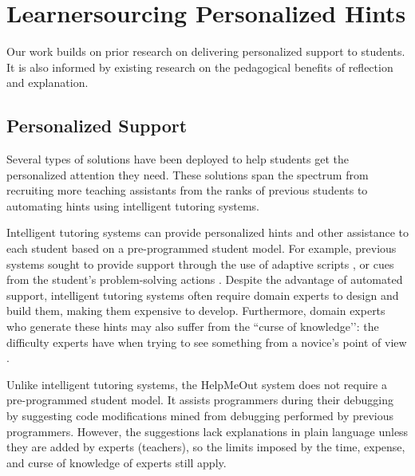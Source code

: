 \section{Learnersourcing Personalized Hints}

Our work builds on prior research on delivering personalized support to students. It is also informed by existing research on the pedagogical benefits of reflection and explanation.

\subsection{Personalized Support}

Several types of solutions have been deployed to help students get the personalized attention they need. These solutions span the spectrum from recruiting more teaching assistants from the ranks of previous students \cite{communityTAs} to automating hints using intelligent tutoring systems. 

Intelligent tutoring systems can provide personalized hints and other assistance to each student based on a pre-programmed student model. For example, previous systems sought to provide support through the use of adaptive scripts \cite{kumar2007tutorial}, or cues from the student’s problem-solving actions \cite{diziol}. Despite the advantage of automated support, intelligent tutoring systems often require domain experts to design and build them, making them expensive to develop.  Furthermore, domain experts who generate these hints may also suffer from the ``curse of knowledge’’: the difficulty experts have when trying to see something from a novice’s point of view \cite{curse}. 

Unlike intelligent tutoring systems, the HelpMeOut system \cite{helpmeout} does not require a pre-programmed student model. It assists programmers during their debugging by suggesting code modifications mined from debugging performed by previous programmers. However, the suggestions lack explanations in plain language unless they are added by experts (teachers), so the limits imposed by the time, expense, and curse of knowledge of experts still apply.

